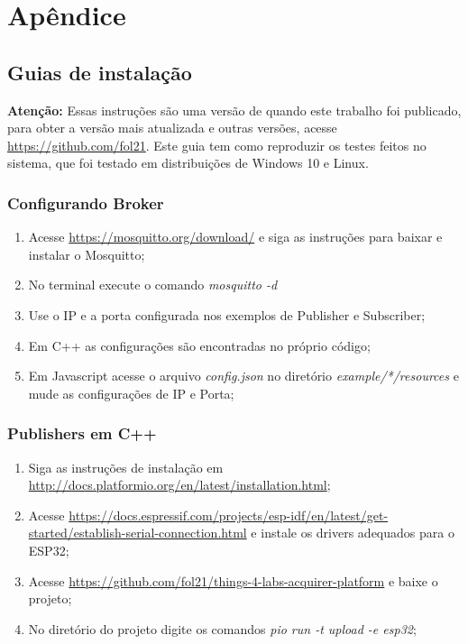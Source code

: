 

\chapter{Apêndice}
\label{chapter:apendice}

\section{Guias de instalação}
\label{section:guia}

\textbf{Atenção:} Essas instruções são uma versão de quando este trabalho foi publicado, para obter a versão mais atualizada e outras versões, acesse \url{https://github.com/fol21}. Este guia tem como reproduzir os testes feitos no sistema, que foi testado em distribuições de Windows 10 e Linux.

\subsection{Configurando Broker}
\label{subsection:guia_broker}

\begin{enumerate}

\item Acesse \url{https://mosquitto.org/download/} e siga as instruções para baixar e instalar o Mosquitto;
\item No terminal execute o comando \textit{mosquitto -d}
\item Use o IP e a porta configurada nos exemplos de Publisher e Subscriber;
\item Em C++ as configurações são encontradas no próprio código;
\item Em Javascript acesse o arquivo \textit{config.json} no diretório \textit{example/*/resources} e mude as configurações de IP e Porta;
\end{enumerate}

\subsection{Publishers em C++}
\label{subsection:guia_publishers_cpp}

\begin{enumerate}

\item Siga as instruções de instalação em \url{http://docs.platformio.org/en/latest/installation.html};
\item Acesse \url{https://docs.espressif.com/projects/esp-idf/en/latest/get-started/establish-serial-connection.html} e instale os drivers adequados para o ESP32;
\item Acesse \url{https://github.com/fol21/things-4-labs-acquirer-platform} e baixe o projeto;
\item No diretório do projeto digite os comandos \textit{pio run -t upload -e esp32};
\end{enumerate}

